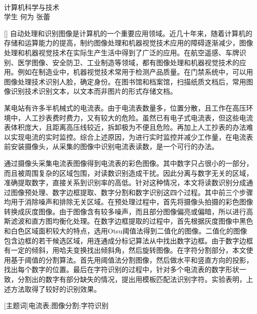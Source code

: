 \begin{center}
\vspace*{18pt}
{\heiti{}\thesistitle}\\[18pt]
\quad 计算机科学与技术\\[12pt]
{\kaishu 学生} \quad 何为  \quad 张蕾\\[24pt]
\end{center}\par

[{}]
自动处理和识别图像是计算机的一个重要应用领域。近几十年来，随着计算机的存储和运算能力的提高，制约图像处理和机器视觉技术应用的障碍逐渐减少，图像处理和机器视觉技术在实际生产生活中得到了广泛的应用。在航空遥感、车牌识别、医学图像、安全防卫、工业制造等领域，都有图像处理和机器视觉技术的应用。例如在制造业中，机器视觉技术常用于检测产品质量。在门禁系统中，可以用图像处理技术识别人脸，确定身份。在图书馆和档案馆，扫描纸质文档后，常用图像识别技术识别文本，以文本而非图片的形式存储文档。

某电站有许多半机械式的电流表。由于电流表数量多，位置分散，且工作在高压环境中，人工抄表费时费力，又有较大的危险。虽然已有电子式电流表，但这些电流表体积庞大，且距离高压线较近，拆卸极为不便且危险。再加上人工抄表的办法难以实现电流的实时监控。综合上述原因，为进行实时监控并减少工作量，在电流表前安装摄像头，从采集的图像中识别电流表读数，是一个可行的办法。

通过摄像头采集电流表图像得到电流表的彩色图像。其中数字只占很小的一部分，而且被周围复杂的区域包围，对读数识别造成干扰。因此分离与数字无关的区域，准确提取数字，直接关系到识别率的高低。针对这种情况，本文将读数识别分成通过图像预处理、数字边框提取、数字分割和数字识别这四个过程。其中前三个步骤均用于消除噪声和排除无关区域。在预处理过程中，首先将摄像头拍摄的彩色图像转换成灰度图像。由于图像含有较多噪声，而且部分图像偏亮或偏暗，所以进行高斯滤波和直方图均衡化处理。在数字边框提取的过程中，首先根据灰度图像中黑色和白色区域面积较大的特点，选用Otsu阈值法得到二值化的图像。二值化的图像包含边框的若干候选区域，用连通成分标记算法从中找出数字边框。由于数字边框有一定的倾斜，用哈夫变换找出倾斜角，然后旋转图像。在字符分割部分，本文使用基于阈值的分割算法。首先用阈值法分割图像，然后做水平和竖直方向的投影，找出每个数字的位置。最后在字符识别的过程中，针对多个电流表的数字形状一致，分割出的数字有部分缺失的情况，提出用模板匹配法识别字符。实验表明，上述方法取得了较好的识别效果。

\vspace{10pt}

[{\heiti 主题词}]{\kaishu 电流表;\quad 图像分割;\quad 字符识别}


